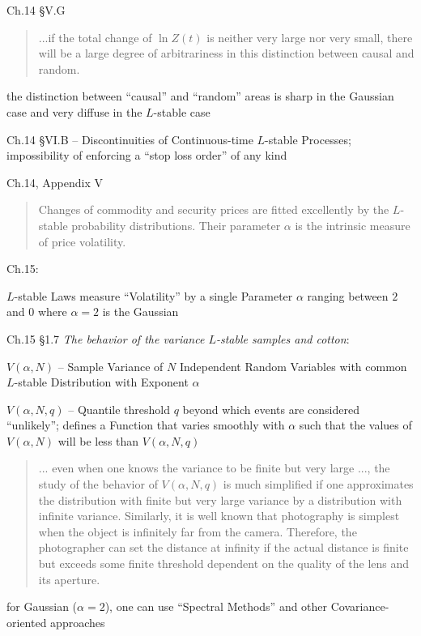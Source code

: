 Ch.14 \S V.G

\begin{quote}
  ...if the total change of $\ln Z(t)$ is neither very large nor very small,
  there will be a large degree of arbitrariness in this distinction between
  causal and random.
\end{quote}

the distinction between ``causal'' and ``random'' areas is sharp in the Gaussian
case and very diffuse in the $L$-stable case

Ch.14 \S VI.B -- Discontinuities of Continuous-time $L$-stable Processes;
impossibility of enforcing a ``stop loss order'' of any kind

Ch.14, Appendix V

\begin{quote}
  Changes of commodity and security prices are fitted excellently by the
  $L$-stable probability distributions. Their parameter $\alpha$ is the
  intrinsic measure of price volatility.
\end{quote}

Ch.15:

$L$-stable Laws measure ``Volatility'' by a single Parameter $\alpha$ ranging
between $2$ and $0$ where $\alpha = 2$ is the Gaussian

Ch.15 \S 1.7 \emph{The behavior of the variance $L$-stable samples and cotton}:

$V(\alpha, N)$ -- Sample Variance of $N$ Independent Random Variables with
common $L$-stable Distribution with Exponent $\alpha$

$V(\alpha, N, q)$ -- Quantile threshold $q$ beyond which events are considered
``unlikely''; defines a Function that varies smoothly with $\alpha$ such that
the values of $V(\alpha, N)$ will be less than $V(\alpha, N, q)$

\begin{quote}
  ... even when one knows the variance to be finite but very large ..., the
  study of the behavior of $V(\alpha, N, q)$ is much simplified if one
  approximates the distribution with finite but very large variance by a
  distribution with infinite variance. Similarly, it is well known that
  photography is simplest when the object is infinitely far from the camera.
  Therefore, the photographer can set the distance at infinity if the actual
  distance is finite but exceeds some finite threshold dependent on the quality
  of the lens and its aperture.
\end{quote}

for Gaussian ($\alpha = 2$), one can use ``Spectral Methods'' and other
Covariance-oriented approaches

